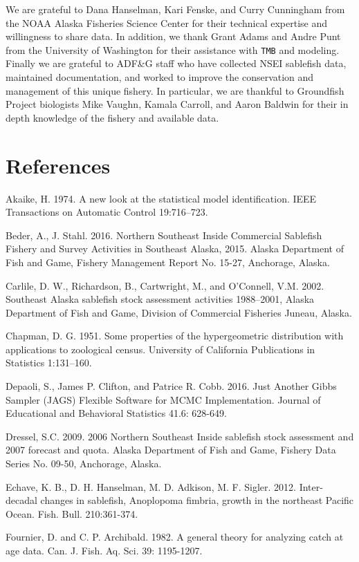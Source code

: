 \documentclass[]{article}
\begin{document}
We are grateful to Dana Hanselman, Kari Fenske, and Curry Cunningham
from the NOAA Alaska Fisheries Science Center for their technical
expertise and willingness to share data. In addition, we thank Grant
Adams and Andre Punt from the University of Washington for their
assistance with \texttt{TMB} and modeling. Finally we are grateful to
ADF\&G staff who have collected NSEI sablefish data, maintained
documentation, and worked to improve the conservation and management of
this unique fishery. In particular, we are thankful to Groundfish
Project biologists Mike Vaughn, Kamala Carroll, and Aaron Baldwin for
their in depth knowledge of the fishery and available data.

\section{References}\label{references}

Akaike, H. 1974. A new look at the statistical model identification.
IEEE Transactions on Automatic Control 19:716--723.

Beder, A., J. Stahl. 2016. Northern Southeast Inside Commercial
Sablefish Fishery and Survey Activities in Southeast Alaska, 2015.
Alaska Department of Fish and Game, Fishery Management Report No. 15-27,
Anchorage, Alaska.

Carlile, D. W., Richardson, B., Cartwright, M., and O'Connell, V.M.
2002. Southeast Alaska sablefish stock assessment activities 1988--2001,
Alaska Department of Fish and Game, Division of Commercial Fisheries
Juneau, Alaska.

Chapman, D. G. 1951. Some properties of the hypergeometric distribution
with applications to zoological census. University of California
Publications in Statistics 1:131--160.

Depaoli, S., James P. Clifton, and Patrice R. Cobb. 2016. Just Another
Gibbs Sampler (JAGS) Flexible Software for MCMC Implementation. Journal
of Educational and Behavioral Statistics 41.6: 628-649.

Dressel, S.C. 2009. 2006 Northern Southeast Inside sablefish stock
assessment and 2007 forecast and quota. Alaska Department of Fish and
Game, Fishery Data Series No. 09-50, Anchorage, Alaska.

Echave, K. B., D. H. Hanselman, M. D. Adkison, M. F. Sigler. 2012.
Inter-decadal changes in sablefish, Anoplopoma fimbria, growth in the
northeast Pacific Ocean. Fish. Bull. 210:361-374.

Fournier, D. and C. P. Archibald. 1982. A general theory for analyzing
catch at age data. Can. J. Fish. Aq. Sci. 39: 1195-1207.
\end{document}

